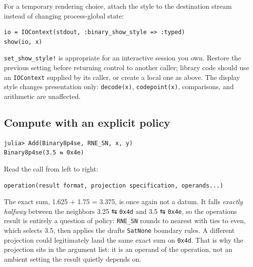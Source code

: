 For a temporary rendering choice, attach the style to the destination stream instead of changing process-global state:




\nopagebreak[4]
\begin{verbatim}
io = IOContext(stdout, :binary_show_style => :typed)
show(io, x)
\end{verbatim}



\texttt{set\_\allowbreak{}show\_\allowbreak{}style!} is appropriate for an interactive session you own. Restore the previous setting before returning control to another caller; library code should use an \texttt{IOContext} supplied by its caller, or create a local one as above. The display style changes presentation only: \texttt{decode(x)}, \texttt{codepoint(x)}, comparisons, and arithmetic are unaffected.



\subsection{Compute with an explicit policy}



\label{16565528013202673474}{}



\begin{verbatim}
julia> Add(Binary8p4se, RNE_SN, x, y)
Binary8p4se(3.5 ⇆ 0x4e)
\end{verbatim}



Read the call from left to right:




\nopagebreak[4]
\begin{verbatim}
operation(result format, projection specification, operands...)
\end{verbatim}



The exact sum, 1.625 + 1.75 = 3.375, is once again not a datum. It falls \emph{exactly halfway} between the neighbors 3.25 ⇆ \texttt{0x4d} and 3.5 ⇆ \texttt{0x4e}, so the operation{\textquotesingle}s result is entirely a question of policy: \texttt{RNE\_\allowbreak{}SN} rounds to nearest with ties to even, which selects 3.5, then applies the draft{\textquotesingle}s \texttt{SatNone} boundary rules. A different projection could legitimately land the same exact sum on \texttt{0x4d}. That is why the projection sits in the argument list: it is an operand of the operation, not an ambient setting the result quietly depends on.



